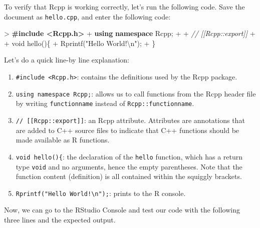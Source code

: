 \documentclass[
]{krantz}
\makeatletter
\newenvironment{Shaded}{\begin{snugshade}}{\end{snugshade}}
\newcommand{\CommentTok}[1]{\textcolor[rgb]{0.37,0.37,0.37}{\textit{#1}}}
\newcommand{\DataTypeTok}[1]{\textcolor[rgb]{0.27,0.27,0.27}{#1}}
\newcommand{\ErrorTok}[1]{\textcolor[rgb]{0.14,0.14,0.14}{\textbf{#1}}}
\newcommand{\KeywordTok}[1]{\textcolor[rgb]{0.27,0.27,0.27}{\textbf{#1}}}
\newcommand{\NormalTok}[1]{#1}
\newcommand{\SpecialCharTok}[1]{\textcolor[rgb]{0,0,0}{#1}}
\newcommand{\StringTok}[1]{\textcolor[rgb]{0.5,0.5,0.5}{#1}}
\providecommand{\tightlist}{%
  \setlength{\itemsep}{0pt}\setlength{\parskip}{0pt}}
\newenvironment{kframe}{%
\medskip{}
\setlength{\fboxsep}{.8em}
 \def\at@end@of@kframe{}%
 \ifinner\ifhmode%
  \def\at@end@of@kframe{\end{minipage}}%
  \begin{minipage}{\columnwidth}%
 \fi\fi%
 \def\FrameCommand##1{\hskip\@totalleftmargin \hskip-\fboxsep
 \colorbox{shadecolor}{##1}\hskip-\fboxsep
     \hskip-\linewidth \hskip-\@totalleftmargin \hskip\columnwidth}%
 \MakeFramed {\advance\hsize-\width
   \@totalleftmargin\z@ \linewidth\hsize
   \@setminipage}}%
 {\par\unskip\endMakeFramed%
 \at@end@of@kframe}
\renewenvironment{Shaded}{\begin{kframe}}{\end{kframe}}
\makeatother
\begin{document}
To verify that Rcpp is working correctly, let's run the following code. Save the document as \texttt{hello.cpp}, and enter the following code:

\begin{Shaded}
\begin{Highlighting}[]
\NormalTok{\textgreater{} }\ErrorTok{\#include \textless{}Rcpp.h\textgreater{}}
\NormalTok{+ }\KeywordTok{using} \KeywordTok{namespace}\NormalTok{ Rcpp;}
\NormalTok{+ }
\NormalTok{+ }\CommentTok{// [[Rcpp::export]]}
\NormalTok{+ }
\NormalTok{+ }\DataTypeTok{void}\NormalTok{ hello()\{}
\NormalTok{+   Rprintf(}\StringTok{"Hello World!}\SpecialCharTok{\textbackslash{}n}\StringTok{"}\NormalTok{);}
\NormalTok{+ \}}
\end{Highlighting}
\end{Shaded}

Let's do a quick line-by line explanation:

\begin{enumerate}
\def\labelenumi{\arabic{enumi}.}
\tightlist
\item
  \texttt{\#include\ \textless{}Rcpp.h\textgreater{}}: contains the definitions used by the Rcpp package.

  \item

  \texttt{using\ namespace\ Rcpp;}: allows us to call functions from the Rcpp header file by writing \texttt{functionname} instead of \texttt{Rcpp::functionname}.

  \item

  \texttt{//\ {[}{[}Rcpp::export{]}{]}}: an Rcpp attribute. Attributes are annotations that are added to C++ source files to indicate that C++ functions should be made available as R functions.

  \item

  \texttt{void\ hello()\{}: the declaration of the \texttt{hello} function, which has a return type \texttt{void} and no arguments, hence the empty parentheses. Note that the function content (definition) is all contained within the squiggly brackets.

  \item

  \texttt{Rprintf("Hello\ World!\textbackslash{}n");}: prints to the R console.
\end{enumerate}

Now, we can go to the RStudio Console and test our code with the following three lines and the expected output.
\end{document}
